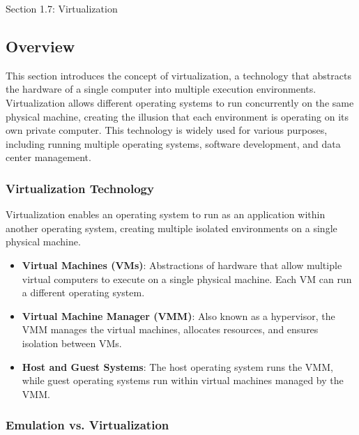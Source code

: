 \begin{notes}{Section 1.7: Virtualization}
    \subsection*{Overview}

    This section introduces the concept of virtualization, a technology that abstracts the hardware of a single computer into multiple execution environments. Virtualization allows different operating systems to run concurrently on the same physical machine, creating the illusion that each environment is operating on its own private computer. This technology is widely used for various purposes, including running multiple operating systems, software development, and data center management.
    
    \subsubsection*{Virtualization Technology}
    
    Virtualization enables an operating system to run as an application within another operating system, creating multiple isolated environments on a single physical machine.
    
    \begin{highlight}
    
    \begin{itemize}
        \item \textbf{Virtual Machines (VMs)}: Abstractions of hardware that allow multiple virtual computers to execute on a single physical machine. Each VM can run a different operating system.
        \item \textbf{Virtual Machine Manager (VMM)}: Also known as a hypervisor, the VMM manages the virtual machines, allocates resources, and ensures isolation between VMs.
        \item \textbf{Host and Guest Systems}: The host operating system runs the VMM, while guest operating systems run within virtual machines managed by the VMM.
    \end{itemize}
    
    \end{highlight}
    
    \subsubsection*{Emulation vs. Virtualization}
    

\end{notes}
